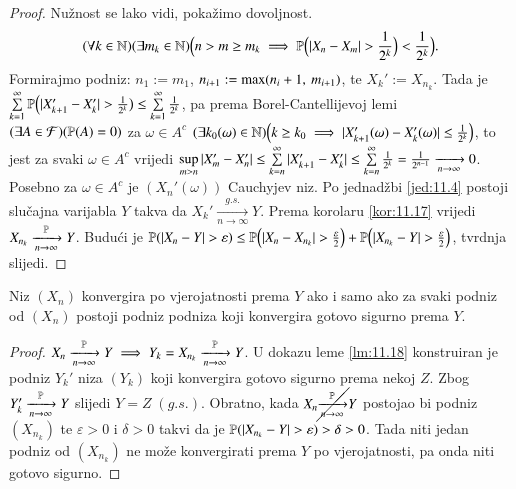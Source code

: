 \begin{proof}
    Nu\v znost se lako vidi, poka\v zimo dovoljnost.
    \begin{equation*}
        (\forall k \in \nat)(\exists m_k \in \nat)\Big(n > m \geq m_k \implies \masP \Big( |X_n - X_m|>\frac{1}{2^k} \Big) < \frac{1}{2^k} \Big).
    \end{equation*}
    Formirajmo podniz: $n_1 := m_1$, $n_{i + 1} := \max ({n_i + 1}, \: {m_{i + 1}})$, te $X_k' := X_{n_k}$.
    Tada je $\sum\limits_{k = 1}^{\infty} \mathbb{P} \Big( |X_{k + 1}' - X_k'| > \frac{1}{2^k} \big) \leq \sum\limits_{k = 1}^{\infty} \frac{1}{2^k}$, pa prema Borel-Cantellijevoj lemi $(\exists A \in \mathcal{F}) (\mathbb{P}({A}) = 0)$ za $\omega \in A^c$ $(\exists k_0 (\omega) \in \mathbb{N}) \Big(k \geq k_0 \implies |X_{k + 1}'(\omega) - X_k' (\omega)| \leq \frac{1}{2^k} \Big)$, to jest za svaki $\omega \in A^c$ vrijedi $\sup\limits_{m > n} |X_m' - X_n'| \leq \sum\limits_{k = n}^{\infty} |X_{k + 1}' - X_k'| \leq \sum\limits_{k = n}^{\infty} \frac{1}{2^k} = \frac{1}{2^{n - 1}} \xrightarrow[n \to \infty]{} 0$.
    Posebno za $\omega \in A^c$ je $(X_n' (\omega))$ Cauchyjev niz.
    Po jednad\v zbi \eqref{jed:11.4} postoji slu\v cajna varijabla $Y$ takva da $X_k' \xrightarrow[n \to \infty]{g.s.} Y$.
    Prema korolaru \ref{kor:11.17} vrijedi $X_{n_k} \xrightarrow[n \to \infty]{\mathbb{P}} Y$.
    Budu\' ci je $\mathbb{P}({|X_n - Y| > \varepsilon}) \leq \mathbb{P} \Big(  |X_n - X_{n_k}| > \frac{\varepsilon}{2} \Big) + \mathbb{P} \Big( |X_{n_k} - Y| > \frac{\varepsilon}{2} \Big)$, tvrdnja slijedi. 
\end{proof}

\begin{tm} \label{tm:11.19}
    Niz $(X_n)$ konvergira po vjerojatnosti prema $Y$ ako i samo ako za svaki podniz od $(X_n)$ postoji podniz podniza koji konvergira gotovo sigurno prema $Y$.
\end{tm}

\begin{proof}
    $X_n \xrightarrow[n \to \infty]{\mathbb{P}} Y \implies Y_k = X_{n_k} \xrightarrow[n \to \infty]{\mathbb{P}} Y$.
    U dokazu leme \ref{lm:11.18} konstruiran je podniz $Y_k'$ niza $(Y_k)$ koji konvergira gotovo sigurno prema nekoj $Z$.
    Zbog $Y_k' \xrightarrow[n \to \infty]{\mathbb{P}} Y$ slijedi $Y=Z \; (g.s.)$.
    Obratno, kada $X_n \cancel{\xrightarrow[n \to \infty]{\mathbb{P}}} Y$ postojao bi podniz $(X_{n_k})$ te $\varepsilon > 0$ i $\delta > 0$ takvi da je $\mathbb{P}({|X_{n_k} - Y| > \varepsilon}) > \delta > 0$.
    Tada niti jedan podniz od $(X_{n_k})$ ne mo\v ze konvergirati prema $Y$ po vjerojatnosti, pa onda niti gotovo sigurno.
\end{proof}

